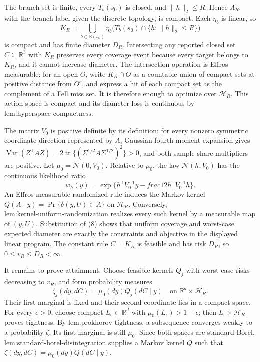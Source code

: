The branch set is finite, every \(T_b(s_0)\) is closed, and \(\|h\|_2\le R\).  Hence \(\Lambda_R\), with the branch label given the discrete topology, is compact.  Each \(\eta_b\) is linear, so
\[
 K_R=\bigcup_{b\in\mathbb B(s_0)}
       \eta_b\bigl(T_b(s_0)\cap\{h:\|h\|_2\le R\}\bigr)
\]
is compact and has finite diameter \(D_R\).  Intersecting any reported closed set \(C\subseteq\mathbb R^3\) with \(K_R\) preserves every coverage event because every target belongs to \(K_R\), and it cannot increase diameter.  The intersection operation is Effros measurable: for an open \(O\), write \(K_R\cap O\) as a countable union of compact sets at positive distance from \(O^c\), and express a hit of each compact set as the complement of a Fell miss set.  It is therefore enough to optimize over \(\mathcal H_R\).  This action space is compact and its diameter loss is continuous by \(\text{lem:hyperspace-compactness}\).

The matrix \(V_0\) is positive definite by its definition: for every nonzero symmetric coordinate direction represented by \(A\), Gaussian fourth-moment expansion gives \(\operatorname{Var}(Z^{\mathsf T}AZ)=2\operatorname{tr}\{(\Sigma^{1/2}A\Sigma^{1/2})^2\}>0\), and both sample-share multipliers are positive.  Let \(\mu_0=\mathcal N(0,V_0)\).  Relative to \(\mu_0\), the law \(\mathcal N(h,V_0)\) has the continuous likelihood ratio
\[
 w_h(y)=\exp\{h^{\mathsf T}V_0^{-1}y-  frac12h^{\mathsf T}V_0^{-1}h\}.
 \tag{8}
\]
An Effros-measurable randomized rule induces the Markov kernel
\(Q(A\mid y)=\Pr\{\delta(y,U)\in A\}\) on \(\mathcal H_R\).  Conversely, \(\text{lem:kernel-uniform-randomization}\) realizes every such kernel by a measurable map of \((y,U)\).  Substitution of (8) shows that uniform coverage and worst-case expected diameter are exactly the constraints and objective in the displayed linear program.  The constant rule \(C=K_R\) is feasible and has risk \(D_R\), so \(0\le v_R\le D_R<\infty\).

It remains to prove attainment.  Choose feasible kernels \(Q_j\) with worst-case risks decreasing to \(v_R\), and form probability measures
\[
 \zeta_j(dy,dC)=\mu_0(dy)Q_j(dC\mid y)
 \quad\text{on }\mathbb R^d\times\mathcal H_R.
\]
Their first marginal is fixed and their second coordinate lies in a compact space.  For every \(\epsilon>0\), choose compact \(L_\epsilon\subset\mathbb R^d\) with \(\mu_0(L_\epsilon)>1-\epsilon\); then \(L_\epsilon\times\mathcal H_R\) proves tightness.  By \(\text{lem:prokhorov-tightness}\), a subsequence converges weakly to a probability \(\zeta\).  Its first marginal is still \(\mu_0\).  Since both spaces are standard Borel, \(\text{lem:standard-borel-disintegration}\) supplies a Markov kernel \(Q\) such that \(\zeta(dy,dC)=\mu_0(dy)Q(dC\mid y)\).

